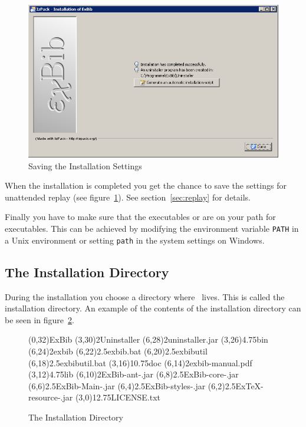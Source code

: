 \begin{figure}[!ht]
  \centering
  \includegraphics[width=.45\textwidth]{img/inst8}
  \caption{Saving the Installation Settings}
  \label{fig:inst7}
\end{figure}

When the installation is completed you get the chance to save the
settings for unattended replay (see figure~\ref{fig:inst7}). See
section~\ref{sec:replay} for details.


Finally you have to make sure that the executables  or
 are on your path for executables. This
can be achieved by modifying the environment variable \verb|PATH| in a
Unix environment or setting \verb|path| in the system settings on
Windows.


\subsection{The Installation Directory}\label{sec:inst.dir}
%

During the installation you choose a directory where \ExBib\ lives.
This is called the installation directory. An example of the contents of the
installation directory can be seen in figure~\ref{fig:inst.dir}.

\begin{figure}[!ht]
  \centering
\begin{DirList}{200pt}{250pt}
  \TOPDIR(0,32){ExBib}
  \DIR(3,30)2{Uninstaller}
  \FILE(6,28)2{uninstaller.jar}
  \DIR(3,26){4.75}{bin}
  \FILE(6,24)2{exbib}
  \FILE(6,22){2.5}{exbib.bat}
  \FILE(6,20){2.5}{exbibutil}
  \FILE(6,18){2.5}{exbibutil.bat}
  \DIR(3,16){10.75}{doc}
  \FILE(6,14)2{exbib-manual.pdf}
  \DIR(3,12){4.75}{lib}
  \FILE(6,10){2}{ExBib-ant-\Version.jar}
  \FILE(6,8){2.5}{ExBib-core-\Version.jar}
  \FILE(6,6){2.5}{ExBib-Main-\Version.jar}
  \FILE(6,4){2.5}{ExBib-styles-\Version.jar}
  \FILE(6,2){2.5}{ExTeX-resource-\Version.jar}
  \FILE(3,0){12.75}{LICENSE.txt}
\end{DirList}
  \caption{The Installation Directory}

  \label{fig:inst.dir}
\end{figure}

